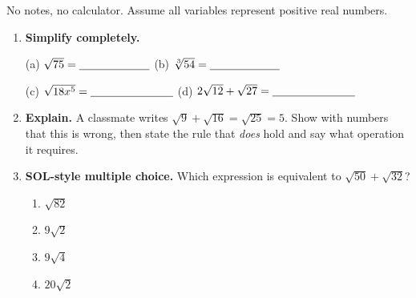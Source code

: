 \documentclass[10pt]{article}
\begin{document}
\namedateperiod

\vspace{0.10in}

No notes, no calculator. Assume all variables represent positive real numbers.

\begin{enumerate}[leftmargin=1.8em, itemsep=10pt]
  \item \textbf{Simplify completely.}

        \vspace{4pt}
        (a) $\sqrt{75} = \blank{2.2cm}$ \hspace{0.5in}
        (b) $\sqrt[3]{54} = \blank{2.2cm}$

        \vspace{4pt}
        (c) $\sqrt{18x^{5}} = \blank{2.6cm}$ \hspace{0.4in}
        (d) $2\sqrt{12}+\sqrt{27} = \blank{2.6cm}$

  \item \textbf{Explain.} A classmate writes $\sqrt{9}+\sqrt{16}=\sqrt{25}=5$. Show with numbers
        that this is wrong, then state the rule that \emph{does} hold and say what operation it
        requires.

  \item \textbf{SOL-style multiple choice.} Which expression is equivalent to
        $\sqrt{50}+\sqrt{32}$?
        \begin{enumerate}[label=\Alph*., leftmargin=1.9em, itemsep=1pt]
          \item $\sqrt{82}$
          \item $9\sqrt{2}$
          \item $9\sqrt{4}$
          \item $20\sqrt{2}$
        \end{enumerate}
\end{enumerate}
\end{document}
